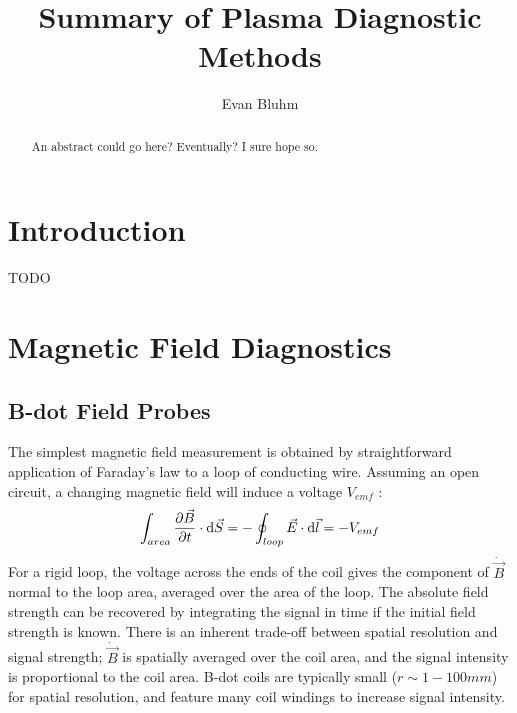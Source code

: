 \documentclass{jpp}
\title{Summary of Plasma Diagnostic Methods}
\author{Evan Bluhm}
\begin{document}
\maketitle

\begin{abstract}
An abstract could go here? Eventually? I sure hope so.
\end{abstract}

\section{Introduction}

{\Large TODO \par}

\section{Magnetic Field Diagnostics}

\subsection{B-dot Field Probes}

The simplest magnetic field measurement is obtained by straightforward application of Faraday's law to a loop of conducting wire. Assuming an open circuit, a changing magnetic field will induce a voltage $V_{emf}$ :
\begin{equation*}
\int_{area} \pdv{\vec B}{t} \cdot \dd \vec S = - \oint _{loop} \vec E \cdot \dd \vec l = - V_{emf}
\end{equation*}
For a rigid loop, the voltage across the ends of the coil gives the component of $\dot{\vec B}$ normal to the loop area, averaged over the area of the loop. The absolute field strength can be recovered by integrating the signal in time if the initial field strength is known. There is an inherent trade-off between spatial resolution and signal strength; $\dot{\vec B}$ is spatially averaged over the coil area, and the signal intensity is proportional to the coil area. B-dot coils are typically small ($r \sim 1-100 mm$) for spatial resolution, and feature many coil windings to increase signal intensity.
\end{document}
